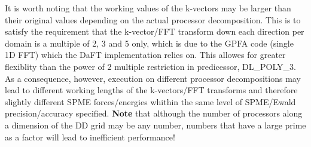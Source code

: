 It is worth noting that the working values of the k-vectors may be larger
than their original values depending on the actual processor decomposition.
This is to satisfy the requirement that the k-vector/FFT transform down
each direction per domain is a multiple of 2, 3 and 5 only, which is due
to the GPFA code (single 1D FFT) which the DaFT implementation relies on.
This allowes for greater flexiblity than the power of 2 multiple
restriction in \D predicessor, DL\_POLY\_3.  As a consequence, however,
execution on different processor decompositions may lead to different
working lengths of the k-vectors/FFT transforms and therefore slightly
different SPME forces/energies whithin the same level of SPME/Ewald
precision/accuracy specified.  {\bf Note} that although the number of
processors along a dimension of the DD grid may be any number, numbers
that have a large prime as a factor will lead to inefficient performance!
